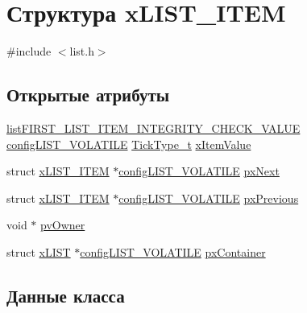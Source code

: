 \hypertarget{structx_l_i_s_t___i_t_e_m}{}\section{Структура x\+L\+I\+S\+T\+\_\+\+I\+T\+EM}
\label{structx_l_i_s_t___i_t_e_m}


{\ttfamily \#include $<$list.\+h$>$}

\subsection*{Открытые атрибуты}
\begin{DoxyCompactItemize}
\item 
\mbox{\hyperlink{list_8h_a3611bd5d5d87cb26ac1dc7a4852b94a0}{list\+F\+I\+R\+S\+T\+\_\+\+L\+I\+S\+T\+\_\+\+I\+T\+E\+M\+\_\+\+I\+N\+T\+E\+G\+R\+I\+T\+Y\+\_\+\+C\+H\+E\+C\+K\+\_\+\+V\+A\+L\+UE}} \mbox{\hyperlink{list_8h_a2d5de557c5561c8980d1bf51d87d8cba}{config\+L\+I\+S\+T\+\_\+\+V\+O\+L\+A\+T\+I\+LE}} \mbox{\hyperlink{portmacro_8h_aa69c48c6e902ce54f70886e6573c92a9}{Tick\+Type\+\_\+t}} \mbox{\hyperlink{structx_l_i_s_t___i_t_e_m_a9b1f26de79f9da1403ca3ebc7a2e653a}{x\+Item\+Value}}
\item 
struct \mbox{\hyperlink{structx_l_i_s_t___i_t_e_m}{x\+L\+I\+S\+T\+\_\+\+I\+T\+EM}} $\ast$\mbox{\hyperlink{list_8h_a2d5de557c5561c8980d1bf51d87d8cba}{config\+L\+I\+S\+T\+\_\+\+V\+O\+L\+A\+T\+I\+LE}} \mbox{\hyperlink{structx_l_i_s_t___i_t_e_m_a03713c4ee953ef5ca6adbec883720c60}{px\+Next}}
\item 
struct \mbox{\hyperlink{structx_l_i_s_t___i_t_e_m}{x\+L\+I\+S\+T\+\_\+\+I\+T\+EM}} $\ast$\mbox{\hyperlink{list_8h_a2d5de557c5561c8980d1bf51d87d8cba}{config\+L\+I\+S\+T\+\_\+\+V\+O\+L\+A\+T\+I\+LE}} \mbox{\hyperlink{structx_l_i_s_t___i_t_e_m_ae8e553eae41010a8e41c66d76c94110b}{px\+Previous}}
\item 
void $\ast$ \mbox{\hyperlink{structx_l_i_s_t___i_t_e_m_aeb3110b50fe0dbce826d929b27b5ddb1}{pv\+Owner}}
\item 
struct \mbox{\hyperlink{structx_l_i_s_t}{x\+L\+I\+ST}} $\ast$\mbox{\hyperlink{list_8h_a2d5de557c5561c8980d1bf51d87d8cba}{config\+L\+I\+S\+T\+\_\+\+V\+O\+L\+A\+T\+I\+LE}} \mbox{\hyperlink{structx_l_i_s_t___i_t_e_m_afb1e27a88f6b064cd0216de08009844a}{px\+Container}}
\end{DoxyCompactItemize}


\subsection{Данные класса}
\mbox{\label{structx_l_i_s_t___i_t_e_m_aeb3110b50fe0dbce826d929b27b5ddb1}} 
